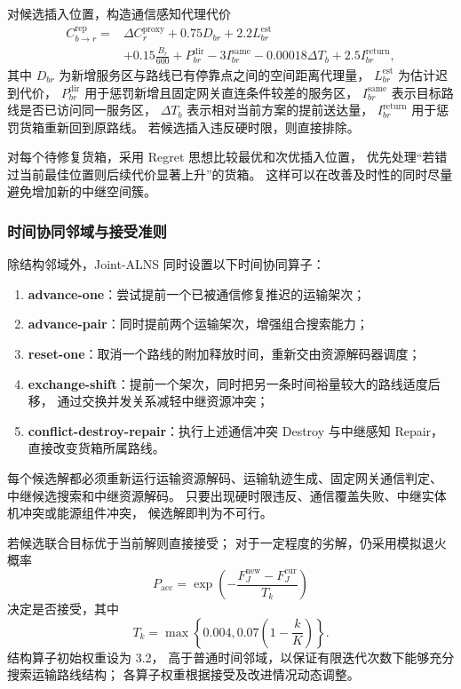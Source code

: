 对候选插入位置，构造通信感知代理代价
\begin{equation}
	\begin{aligned}
		C_{b\rightarrow r}^{\mathrm{rep}}
		={}&\Delta C_{r}^{\mathrm{proxy}}
		+0.75D_{br}
		+2.2L_{br}^{\mathrm{est}} \\
		&+0.15\frac{B_r}{600}
		+P_{br}^{\mathrm{dir}}
		-3I_{br}^{\mathrm{same}}
		-0.00018\Delta T_b
		+2.5I_{br}^{\mathrm{return}},
	\end{aligned}
	\label{eq:q3-repair-score}
\end{equation}
其中 $D_{br}$ 为新增服务区与路线已有停靠点之间的空间距离代理量，
$L_{br}^{\mathrm{est}}$ 为估计迟到代价，
$P_{br}^{\mathrm{dir}}$ 用于惩罚新增且固定网关直连条件较差的服务区，
$I_{br}^{\mathrm{same}}$ 表示目标路线是否已访问同一服务区，
$\Delta T_b$ 表示相对当前方案的提前送达量，
$I_{br}^{\mathrm{return}}$ 用于惩罚货箱重新回到原路线。
若候选插入违反硬时限，则直接排除。

对每个待修复货箱，采用 Regret 思想比较最优和次优插入位置，
优先处理“若错过当前最佳位置则后续代价显著上升”的货箱。
这样可以在改善及时性的同时尽量避免增加新的中继空间簇。

\subsubsection{时间协同邻域与接受准则}

除结构邻域外，Joint-ALNS 同时设置以下时间协同算子：

\begin{enumerate}[label=(\arabic*),leftmargin=3em]
	\item \textbf{advance-one}：尝试提前一个已被通信修复推迟的运输架次；
	\item \textbf{advance-pair}：同时提前两个运输架次，增强组合搜索能力；
	\item \textbf{reset-one}：取消一个路线的附加释放时间，重新交由资源解码器调度；
	\item \textbf{exchange-shift}：提前一个架次，同时把另一条时间裕量较大的路线适度后移，
	通过交换并发关系减轻中继资源冲突；
	\item \textbf{conflict-destroy-repair}：执行上述通信冲突 Destroy 与中继感知 Repair，直接改变货箱所属路线。
\end{enumerate}

每个候选解都必须重新运行运输资源解码、运输轨迹生成、固定网关通信判定、
中继候选搜索和中继资源解码。
只要出现硬时限违反、通信覆盖失败、中继实体机冲突或能源组件冲突，
候选解即判为不可行。

若候选联合目标优于当前解则直接接受；
对于一定程度的劣解，仍采用模拟退火概率
\begin{equation}
	P_{\mathrm{acc}}
	=\exp\left(-\frac{F_J^{\mathrm{new}}-F_J^{\mathrm{cur}}}{T_k}\right)
	\label{eq:q3-sa}
\end{equation}
决定是否接受，其中
\begin{equation}
	T_k
	=\max\left\{0.004,
	0.07\left(1-\frac{k}{K}\right)
	\right\}.
	\label{eq:q3-temperature}
\end{equation}
结构算子初始权重设为 3.2，
高于普通时间邻域，以保证有限迭代次数下能够充分搜索运输路线结构；
各算子权重根据接受及改进情况动态调整。

